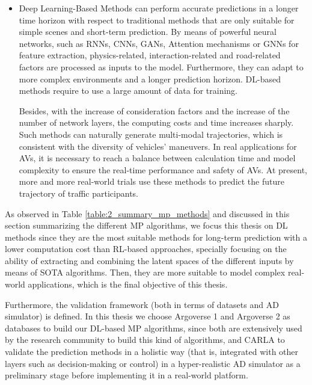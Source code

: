 \begin{itemize}
	\item Deep Learning-Based Methods can perform accurate predictions in a longer time horizon with respect to traditional methods that are only suitable for simple scenes and short-term prediction. By means of powerful neural networks, such as RNNs, CNNs, GANs, Attention mechanisms or GNNs for feature extraction, physics-related, interaction-related and road-related factors are processed as inputs to the model. Furthermore, they can adapt to more complex environments and a longer prediction horizon. \ac{DL}-based methods require to use a large amount of data for training.
	
	Besides, with the increase of consideration factors and the increase of the number of network layers, the computing costs and time increases sharply. Such methods can naturally generate multi-modal trajectories, which is consistent with the diversity of vehicles’ maneuvers. In real applications for AVs, it is necessary to reach a balance between calculation time and model complexity to ensure the real-time performance and safety of AVs. At present, more and more real-world trials use these methods to predict the future trajectory of traffic participants.
\end{itemize}	
	
As observed in Table \ref{table:2_summary_mp_methods} and discussed in this section summarizing the different \ac{MP} algorithms, we focus this thesis on \ac{DL} methods since they are the most suitable methods for long-term prediction with a lower computation cost than RL-based approaches, specially focusing on the ability of extracting and combining the latent spaces of the different inputs by means of \ac{SOTA} algorithms. Then, they are more suitable to model complex real-world applications, which is the final objective of this thesis.

Furthermore, the validation framework (both in terms of datasets and \ac{AD} simulator) is defined. In this thesis we choose Argoverse 1 and Argoverse 2 as databases to build our \ac{DL}-based \ac{MP} algorithms, since both are extensively used by the research community to build this kind of algorithms, and CARLA to validate the prediction methods in a holistic way (that is, integrated with other layers such as decision-making or control) in a hyper-realistic \ac{AD} simulator as a preliminary stage before implementing it in a real-world platform.